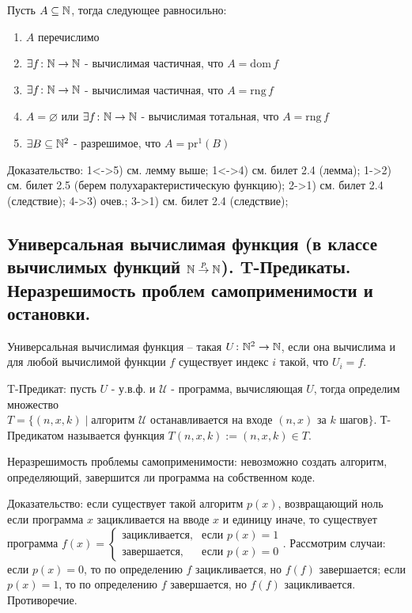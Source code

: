 \documentclass[a4paper, 10pt]{article}
\newcommand{\UU}{\mathcal{U}}
\newcommand{\dom}{\text{dom}\,}
\newcommand{\rng}{\text{rng}\,}
\newcommand{\pr}{\text{pr}}
\begin{document}
\hfill

Пусть $A\subseteq\mathbb{N}$, тогда следующее равносильно:
\begin{enumerate}
    \item $A$ перечислимо
    \item $\exists f\colon\mathbb{N}\to\mathbb{N}$ - вычислимая частичная, что $A=\dom f$
    \item $\exists f\colon\mathbb{N}\to\mathbb{N}$ - вычислимая частичная, что $A=\rng f$
    \item $A=\varnothing$ или $\exists f\colon\mathbb{N}\to\mathbb{N}$ - вычислимая тотальная, что $A=\rng f$
    \item $\exists B\subseteq\mathbb{N}^2$ - разрешимое, что $A=\pr^1(B)$
\end{enumerate}

Доказательство: 1<->5) см. лемму выше; 1<->4) см. билет 2.4 (лемма); 1->2) см. билет 2.5 (берем полухарактеристическую функцию); 2->1) см. билет 2.4 (следствие); 4->3) очев.; 3->1) см. билет 2.4 (следствие);

\subsection{Универсальная вычислимая функция (в классе вычислимых функций $\mathbb{N}\stackrel{p}{\to}\mathbb{N}$). T-Предикаты. Неразрешимость проблем самоприменимости и остановки.}

Универсальная вычислимая функция -- такая $U\colon\mathbb{N}^2\to\mathbb{N}$, если она вычислима и для любой вычислимой функции $f$ существует индекс $i$ такой, что $U_i=f$.

\hfill

T-Предикат: пусть $U$ - у.в.ф. и $\UU$ - программа, вычисляющая $U$, тогда определим множество $T=\{(n,x,k) \mid \text{алгоритм $\UU$ останавливается на входе $(n,x)$ за $k$ шагов}\}$. Т-Предикатом называется функция $T(n,x,k):=(n,x,k)\in T$.

\hfill

Неразрешимость проблемы самоприменимости: невозможно создать алгоритм, определяющий, завершится ли программа на собственном коде.

Доказательство: если существует такой алгоритм $p(x)$, возвращающий ноль если программа $x$ зацикливается на вводе $x$ и единицу иначе, то существует программа $f(x)=\begin{cases}
    \text{зацикливается},&\text{если $p(x)=1$} \\ \text{завершается},&\text{если $p(x)=0$}
\end{cases}$. Рассмотрим случаи: если $p(x)=0$, то по определению $f$ зацикливается, но $f(f)$ завершается; если $p(x)=1$, то по определению $f$ завершается, но $f(f)$ зацикливается. Противоречие.
\end{document}
